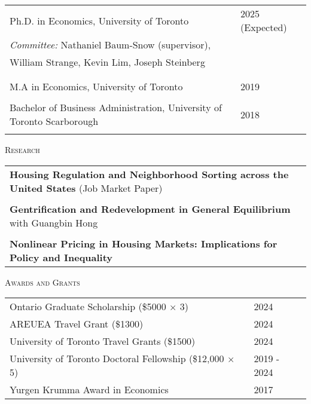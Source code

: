 \documentclass[11pt]{amsart}
\begin{document}
\normalsize
\begin{tabular}{ p{12.5cm}  p{5cm}}
  \large{Ph.D. in Economics, University of Toronto}  & 2025 (Expected) \\
   \multicolumn{2}{l}{ \hspace{.75cm}  \emph{Committee:}  Nathaniel Baum-Snow (supervisor), } \\
     \hspace{2.8cm}  William Strange, Kevin Lim, Joseph Steinberg  \\
 \hspace{2.90cm}   \\
  \\
  \large{M.A in Economics, University of Toronto}    & 2019            \\
   \\
  \large{Bachelor of Business Administration, University of Toronto Scarborough}   & 2018            \\
                                                     &                 
\end{tabular}

\vspace{0.4cm}




\LARGE
\textsc{Research}
\vspace{0.2cm}
\normalsize

\begin{tabular}{ p{15.5cm}}
 \textbf{Housing Regulation and Neighborhood Sorting across the United States} (Job Market Paper)                         \\

\\
 \textbf{Gentrification and Redevelopment in General Equilibrium}  with Guangbin Hong \\
\\
\textbf{Nonlinear Pricing in Housing Markets: Implications for Policy and Inequality} 
\normalsize
\end{tabular}

\vspace{0.4cm}

\LARGE
\textsc{Awards and Grants}
\vspace{0.2cm}


\normalsize 
\begin{tabular}{ p{12.5cm}  p{5cm}}
  Ontario Graduate Scholarship (\$5000 $\times$ 3) & 2024 \\
  AREUEA Travel Grant (\$1300)    & 2024         \\
  University of Toronto Travel Grants (\$1500) & 2024 \\
  University of Toronto Doctoral Fellowship  (\$12,000 $ \times$ 5)  & 2019 - 2024  \\
  Yurgen Krumma Award in Economics & 2017
\end{tabular}
\end{document}
